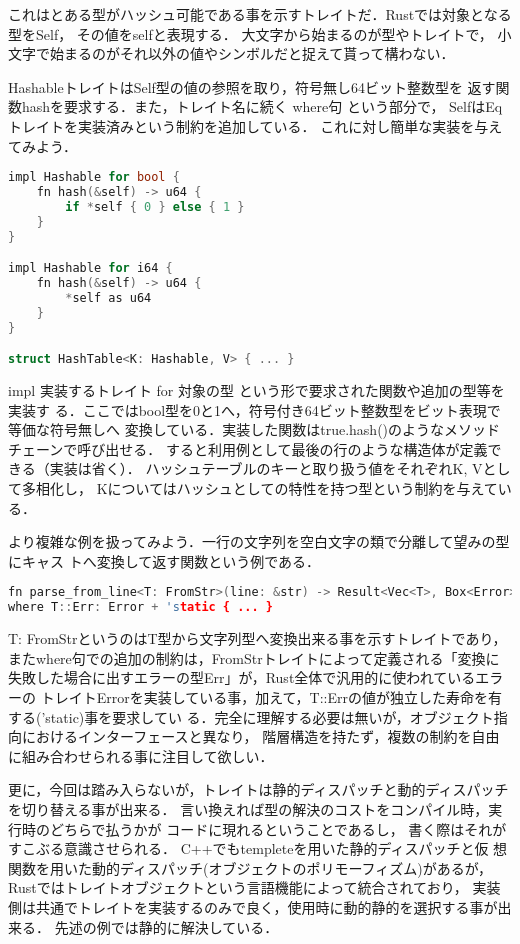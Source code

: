 これはとある型がハッシュ可能である事を示すトレイトだ．Rustでは対象となる型をSelf，
その値をselfと表現する．
大文字から始まるのが型やトレイトで，
小文字で始まるのがそれ以外の値やシンボルだと捉えて貰って構わない．

HashableトレイトはSelf型の値の参照を取り，符号無し64ビット整数型を
返す関数hashを要求する．また，トレイト名に続く where句 という部分で，
SelfはEqトレイトを実装済みという制約を追加している．
これに対し簡単な実装を与えてみよう．

\begin{lstlisting}[language={C++},caption=トレイトの実装と利用例,label=hash_use]
impl Hashable for bool {
    fn hash(&self) -> u64 {
        if *self { 0 } else { 1 }
    }
}

impl Hashable for i64 {
    fn hash(&self) -> u64 {
        *self as u64
    }
}

struct HashTable<K: Hashable, V> { ... }
\end{lstlisting}

impl 実装するトレイト for 対象の型 という形で要求された関数や追加の型等を実装す
る．ここではbool型を0と1へ，符号付き64ビット整数型をビット表現で等価な符号無しへ
変換している．実装した関数はtrue.hash()のようなメソッドチェーンで呼び出せる．
すると利用例として最後の行のような構造体が定義できる（実装は省く）．
ハッシュテーブルのキーと取り扱う値をそれぞれK, Vとして多相化し，
Kについてはハッシュとしての特性を持つ型という制約を与えている．

より複雑な例を扱ってみよう．一行の文字列を空白文字の類で分離して望みの型にキャス
トへ変換して返す関数という例である．

\begin{lstlisting}[language={C++},caption=トレイトの複合, label=trait_cmpl]
fn parse_from_line<T: FromStr>(line: &str) -> Result<Vec<T>, Box<Error>>
where T::Err: Error + 'static { ... }
\end{lstlisting}

T: FromStrというのはT型から文字列型へ変換出来る事を示すトレイトであり，
またwhere句での追加の制約は，FromStrトレイトによって定義される「変換に
失敗した場合に出すエラーの型Err」が，Rust全体で汎用的に使われているエラーの
トレイトErrorを実装している事，加えて，T::Errの値が独立した寿命を有する('static)事を要求してい
る．完全に理解する必要は無いが，オブジェクト指向におけるインターフェースと異なり，
階層構造を持たず，複数の制約を自由に組み合わせられる事に注目して欲しい．

更に，今回は踏み入らないが，トレイトは静的ディスパッチと動的ディスパッチを切り替える事が出来る．
言い換えれば型の解決のコストをコンパイル時，実行時のどちらで払うかが
コードに現れるということであるし，
書く際はそれがすこぶる意識させられる．
C++でもtempleteを用いた静的ディスパッチと仮
想関数を用いた動的ディスパッチ(オブジェクトのポリモーフィズム)があるが，
Rustではトレイトオブジェクトという言語機能によって統合されており，
実装側は共通でトレイトを実装するのみで良く，使用時に動的静的を選択する事が出来る．
先述の例では静的に解決している．

